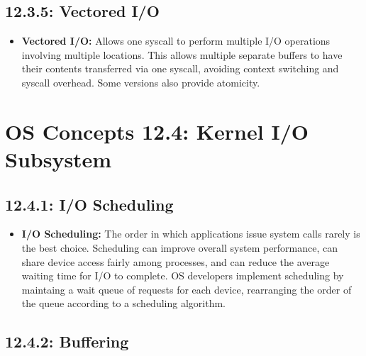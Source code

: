 \documentclass[12pt]{article}
\begin{document}
\subsection*{12.3.5: Vectored I/O}

\begin{itemize}
    \item \textbf{Vectored I/O:} Allows one syscall to perform multiple I/O operations involving multiple locations. This allows multiple separate buffers to have their contents transferred via one syscall, avoiding context switching and syscall overhead. Some versions also provide atomicity.
\end{itemize}

\section*{OS Concepts 12.4: Kernel I/O Subsystem}

\subsection*{12.4.1: I/O Scheduling}

\begin{itemize}
    \item \textbf{I/O Scheduling:} The order in which applications issue system calls rarely is the best choice. Scheduling can improve overall system performance, can share device access fairly among processes, and can reduce the average waiting time for I/O to complete. OS developers implement scheduling by maintaing a wait queue of requests for each device, rearranging the order of the queue according to a scheduling algorithm.
\end{itemize}

\subsection*{12.4.2: Buffering}
\end{document}
